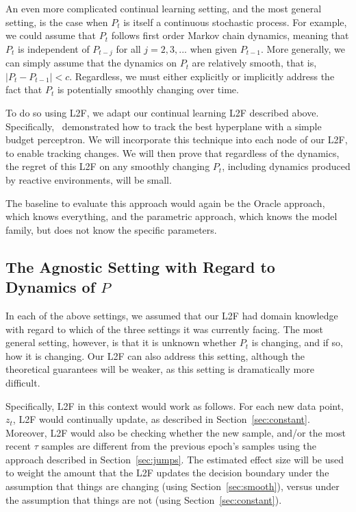 \documentclass{article}
\begin{document}
An even more complicated continual learning setting, and the most general setting, is the case when $P_t$ is itself a continuous stochastic process.  For example, we could assume that $P_t$ follows  first order Markov chain dynamics, meaning that $P_t$ is independent of $P_{t-j}$  for all $j=2,3,...$ when given $P_{t-1}$.  More generally, we can simply assume that the dynamics on $P_t$ are relatively smooth, that is, $|P_t - P_{t-1}| < c$.  Regardless, we must either explicitly or implicitly address the fact that $P_t$ is potentially smoothly changing over time.  

To do so using L2F, we adapt our continual learning L2F described above.  Specifically,~\citet{Cavallanti2007} demonstrated how to track the best hyperplane with a simple budget perceptron.  We will incorporate this technique into each node of our L2F, to enable tracking changes. We will then prove that regardless of the dynamics, the regret of this L2F on any smoothly changing $P_t$, including dynamics produced by reactive environments, will be small.  

The baseline to evaluate this approach would again be the Oracle approach, which knows everything, and the parametric approach, which knows the model family, but does not know the specific parameters. 




\subsection{The Agnostic Setting with Regard to Dynamics of $P$}
\label{sec:combo}


In each of the above settings, we assumed that our L2F had domain knowledge with regard to which of the three settings it was currently facing.  The most general setting, however, is that it is unknown whether $P_t$ is changing, and if so, how it is changing.  Our L2F can also address this setting, although the theoretical guarantees will be weaker, as this setting is dramatically more difficult.  

Specifically, L2F in this context would work as follows.  For each new data point, $z_t$, L2F would continually update, as described in Section~\ref{sec:constant}.  Moreover, L2F would also be checking whether the new sample, and/or the most recent $\tau$ samples are different from the previous epoch's samples using the approach described in Section~\ref{sec:jumps}.  The estimated effect size will be used to weight the amount that the L2F updates the decision boundary under the assumption that things are changing (using Section~\ref{sec:smooth}), versus under the assumption that things are not (using Section~\ref{sec:constant}).  
\end{document}
